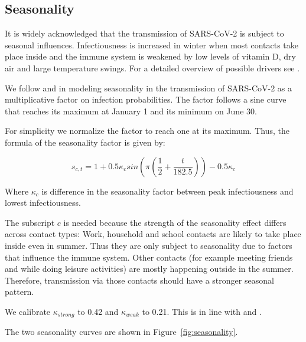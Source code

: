 \subsection{Seasonality}
\label{subsec:seasonality}

It is widely acknowledged that the transmission of SARS-CoV-2 is subject to seasonal
influences. Infectiousness is increased in winter when most contacts take place inside
and the immune system is weakened by low levels of vitamin D, dry air and large
temperature swings. For a detailed overview of possible drivers see
\cite{KronfeldSchor2021}.

We follow \cite{Kuehn2020} and \cite{Gavenciak2021} in modeling seasonality in the
transmission of SARS-CoV-2 as a multiplicative factor on infection probabilities. The
factor follows a sine curve that reaches its maximum at January 1 and its minimum
on June 30.

For simplicity we normalize the factor to reach one at its maximum. Thus, the formula of
the seasonality factor is given by:

\begin{equation}
\label{eq:seasonality}
    s_{c, t} = 1 + 0.5 \kappa_c  sin \left ( \pi  \left (\frac{1}{2} + \frac{t}{182.5}\right ) \right ) - 0.5 \kappa_c
\end{equation}

Where $\kappa_c$ is difference in the seasonality factor between peak infectiousness
and lowest infectiousness.

The subscript $c$ is needed because the strength of the seasonality effect differs
across contact types: Work, household and school contacts are likely to take place
inside even in summer. Thus they are only subject to seasonality due to factors that
influence the immune system. Other contacts (for example meeting friends and while doing
leisure activities) are mostly happening outside in the summer. Therefore, transmission
via those contacts should have a stronger seasonal pattern.

We calibrate $\kappa_{strong}$ to 0.42 and $\kappa_{weak}$ to 0.21. This is in line with
\cite{Gavenciak2021} and \cite{Kuehn2020}.

The two seasonality curves are shown in Figure~\ref{fig:seasonality}.

